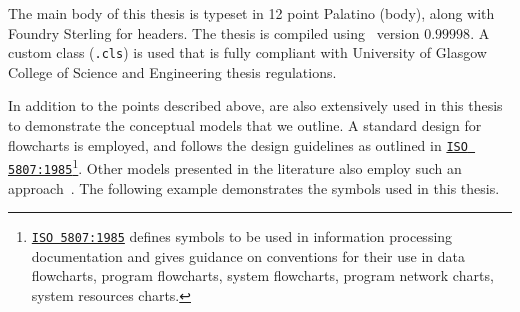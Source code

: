 \begin{preamble}


The main body of this thesis is typeset in 12 point Palatino (body), along with \metafont\selectfont Foundry Sterling for headers. \normalfont\selectfont The thesis is compiled using \XeTeX\ version $0.99998$. A custom class (\texttt{.cls}) is used that is fully compliant with University of Glasgow College of Science and Engineering thesis regulations.

In addition to the points described above,  are also extensively used in this thesis to demonstrate the conceptual models that we outline. A standard design for flowcharts is employed, and follows the design guidelines as outlined in \href{https://www.iso.org/standard/11955.html}{\texttt{ISO 5807:1985}}\footnote{\href{https://www.iso.org/standard/11955.html}{\texttt{ISO 5807:1985}} defines symbols to be used in information processing documentation and gives guidance on conventions for their use in data flowcharts, program flowcharts, system flowcharts, program network charts, system resources charts.}. Other models presented in the literature also employ such an approach~\citep{thomas2014modelling_behaviour}. The following example demonstrates the symbols used in this thesis.

\begin{figure}[h!]
    \centering
\end{figure}


\end{preamble}
